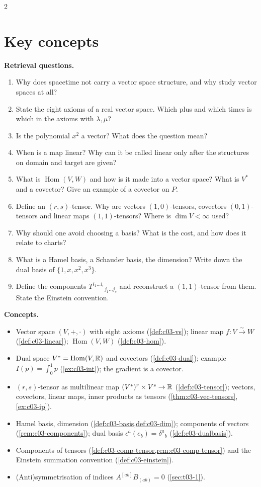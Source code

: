 \begin{paracol}{2}
\section*{Key concepts}
\begin{keyconcepts}
\textbf{Retrieval questions.}
\begin{enumerate}
  \item Why does spacetime not carry a vector space structure, and why study vector spaces at all?
  \item State the eight axioms of a real vector space. Which plus and which times is which in the axioms with $\lambda,\mu$?
  \item Is the polynomial $x^2$ a vector? What does the question mean?
  \item When is a map linear? Why can it be called linear only after the structures on domain and target are given?
  \item What is $\operatorname{Hom}(V,W)$ and how is it made into a vector space? What is $V^*$ and a covector? Give an example of a covector on $P$.
  \item Define an $(r,s)$-tensor. Why are vectors $(1,0)$-tensors, covectors $(0,1)$-tensors and linear maps $(1,1)$-tensors? Where is $\dim V<\infty$ used?
  \item Why should one avoid choosing a basis? What is the cost, and how does it relate to charts?
  \item What is a Hamel basis, a Schauder basis, the dimension? Write down the dual basis of $\{1,x,x^2,x^3\}$.
  \item Define the components $T^{i_1\dots i_r}{}_{j_1\dots j_s}$ and reconstruct a $(1,1)$-tensor from them. State the Einstein convention.
\end{enumerate}
\textbf{Concepts.}
\begin{itemize}
  \item Vector space $(V,+,\cdot)$ with eight axioms (\cref{def:c03-vs}); linear map $f\colon V\xrightarrow{\sim}W$ (\cref{def:c03-linear}); $\operatorname{Hom}(V,W)$ (\cref{def:c03-hom}).
  \item Dual space $V^*=\operatorname{Hom}(V,\mathbb{R})$ and covectors (\cref{def:c03-dual}); example $I(p)=\int_0^1p$ (\cref{ex:c03-int}); the gradient is a covector.
  \item $(r,s)$-tensor as multilinear map $(V^*)^r\times V^s\to\mathbb{R}$ (\cref{def:c03-tensor}); vectors, covectors, linear maps, inner products as tensors (\cref{thm:c03-vec-tensors}, \cref{ex:c03-ip}).
  \item Hamel basis, dimension (\cref{def:c03-basis,def:c03-dim}); components of vectors (\cref{rem:c03-components}); dual basis $\epsilon^a(e_b)=\delta^a{}_b$ (\cref{def:c03-dualbasis}).
  \item Components of tensors (\cref{def:c03-comp-tensor,rem:c03-comp-tensor}) and the Einstein summation convention (\cref{def:c03-einstein}).
  \item (Anti)symmetrisation of indices $A^{[ab]}B_{(ab)}=0$ (\cref{sec:t03-1}).
\end{itemize}
\end{keyconcepts}

\flushside
\end{paracol}
